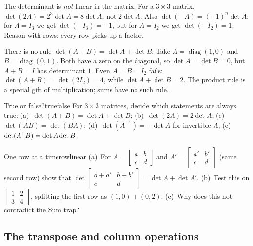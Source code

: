 \documentclass[11pt]{article}
\begin{document}
\begin{warn}
The determinant is \emph{not} linear in the matrix. For a $3\times3$ matrix, $\det(2A)=2^3\det A=8\det A$, not $2\det A$. Also $\det(-A)=(-1)^n\det A$: for $A=I_3$ we get $\det(-I_3)=-1$, but for $A=I_2$ we get $\det(-I_2)=1$. Reason with rows: every row picks up a factor.
\end{warn}

\begin{warn}
There is no rule $\det(A+B)=\det A+\det B$. Take $A=\operatorname{diag}(1,0)$ and $B=\operatorname{diag}(0,1)$. Both have a zero on the diagonal, so $\det A=\det B=0$, but $A+B=I$ has determinant $1$. Even $A=B=I_2$ fails: $\det(A+B)=\det(2I_2)=4$, while $\det A+\det B=2$. The product rule is a special gift of multiplication; sums have no such rule.
\end{warn}

\begin{kc}{True or false?}{truefalse}
For $3\times3$ matrices, decide which statements are always true: (a)~$\det(A+B)=\det A+\det B$; (b)~$\det(2A)=2\det A$; (c)~$\det(AB)=\det(BA)$; (d)~$\det(A^{-1})=-\det A$ for invertible $A$; (e)~$\det(A^{\mathsf T} B)=\det A\det B$.
\end{kc}

\begin{think}{One row at a time}{rowlinear}
(a)~For $A=\begin{bmatrix}a&b\\c&d\end{bmatrix}$ and $A'=\begin{bmatrix}a'&b'\\c&d\end{bmatrix}$ (same second row) show that $\det\begin{bmatrix}a+a'&b+b'\\c&d\end{bmatrix}=\det A+\det A'$. (b)~Test this on $\begin{bmatrix}1&2\\3&4\end{bmatrix}$, splitting the first row as $(1,0)+(0,2)$. (c)~Why does this not contradict the Sum trap?
\end{think}

\subsection*{The transpose and column operations}
\end{document}
